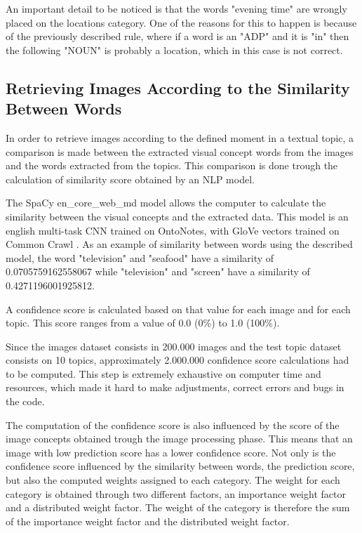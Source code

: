     An important detail to be noticed is that the words "evening time" are wrongly placed on the locations category. One of the reasons for this to happen is because of the previously described rule, where if a word is an "ADP" and it is "in" then the following "NOUN" is probably a location, which in this case is not correct.

    \subsection{Retrieving Images According to the Similarity Between Words}

    In order to retrieve images according to the defined moment in a textual topic, a comparison is made between the extracted visual concept words from the images and the words extracted from the topics. This comparison is done trough the calculation of similarity score obtained by an NLP model.

    The SpaCy en\_core\_web\_md model allows the computer to calculate the similarity between the visual concepts and the extracted data. This model is an english multi-task CNN trained on OntoNotes, with GloVe vectors trained on Common Crawl \cite{Spacy2017} . As an example of similarity between words using the described model, the word "television" and "seafood" have a similarity of 0.0705759162558067 while "television" and "screen" have a similarity of 0.4271196001925812.
    
    A confidence score is calculated based on that value for each image and for each topic. This score ranges from a value of 0.0 (0\%) to 1.0 (100\%).

    Since the images dataset consists in 200.000 images and the test topic dataset consists on 10 topics, approximately 2.000.000 confidence score calculations had to be computed. This step is extremely exhaustive on computer time and resources, which made it  hard to make adjustments, correct errors and bugs in the code.
    
    The computation of the confidence score is also influenced by the score of the image concepts obtained trough the image processing phase. This means that an image with low prediction score has a lower confidence score. Not only is the confidence score influenced by the similarity between words, the prediction score, but also the computed weights assigned to each category. The weight for each category is obtained through two different factors, an importance weight factor and a distributed weight factor. The weight of the category is therefore the sum of the importance weight factor and the distributed weight factor.


